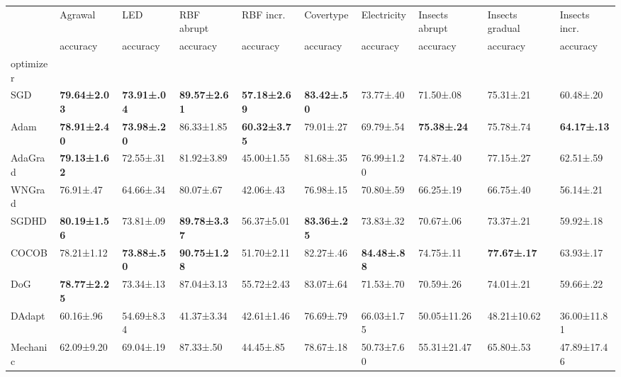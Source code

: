 \begin{tabular}{llllllllll}
    \toprule
                 & Agrawal              & LED                 & RBF abrupt           & RBF incr.            & Covertype           & Electricity         & Insects abrupt      & Insects gradual     & Insects incr.       \\
                 & accuracy             & accuracy            & accuracy             & accuracy             & accuracy            & accuracy            & accuracy            & accuracy            & accuracy            \\
    optimizer    &                      &                     &                      &                      &                     &                     &                     &                     &                     \\
    \midrule
    SGD          & \bfseries 79.64±2.03 & \bfseries 73.91±.04 & \bfseries 89.57±2.61 & \bfseries 57.18±2.69 & \bfseries 83.42±.50 & 73.77±.40           & 71.50±.08           & 75.31±.21           & 60.48±.20           \\
    Adam         & \bfseries 78.91±2.40 & \bfseries 73.98±.20 & 86.33±1.85           & \bfseries 60.32±3.75 & 79.01±.27           & 69.79±.54           & \bfseries 75.38±.24 & 75.78±.74           & \bfseries 64.17±.13 \\
    AdaGrad      & \bfseries 79.13±1.62 & 72.55±.31           & 81.92±3.89           & 45.00±1.55           & 81.68±.35           & 76.99±1.20          & 74.87±.40           & 77.15±.27           & 62.51±.59           \\
    WNGrad       & 76.91±.47            & 64.66±.34           & 80.07±.67            & 42.06±.43            & 76.98±.15           & 70.80±.59           & 66.25±.19           & 66.75±.40           & 56.14±.21           \\
    SGDHD        & \bfseries 80.19±1.56 & 73.81±.09           & \bfseries 89.78±3.37 & 56.37±5.01           & \bfseries 83.36±.25 & 73.83±.32           & 70.67±.06           & 73.37±.21           & 59.92±.18           \\
    COCOB        & 78.21±1.12           & \bfseries 73.88±.50 & \bfseries 90.75±1.28 & 51.70±2.11           & 82.27±.46           & \bfseries 84.48±.88 & 74.75±.11           & \bfseries 77.67±.17 & 63.93±.17           \\
    DoG          & \bfseries 78.77±2.25 & 73.34±.13           & 87.04±3.13           & 55.72±2.43           & 83.07±.64           & 71.53±.70           & 70.59±.26           & 74.01±.21           & 59.66±.22           \\
    DAdapt       & 60.16±.96            & 54.69±8.34          & 41.37±3.34           & 42.61±1.46           & 76.69±.79           & 66.03±1.75          & 50.05±11.26         & 48.21±10.62         & 36.00±11.81         \\
    Mechanic     & 62.09±9.20           & 69.04±.19           & 87.33±.50            & 44.45±.85            & 78.67±.18           & 50.73±7.60          & 55.31±21.47         & 65.80±.53           & 47.89±17.46         \\
    \bottomrule
\end{tabular}
